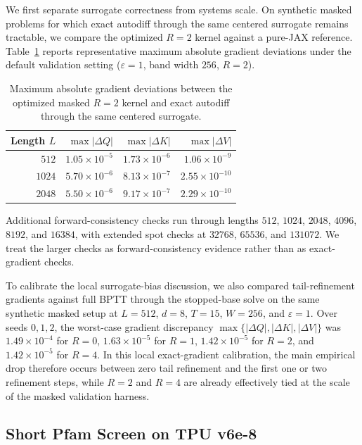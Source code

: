 We first separate surrogate correctness from systems scale. On synthetic masked problems for which exact autodiff through the same centered surrogate remains tractable, we compare the optimized $R=2$ kernel against a pure-JAX reference. Table~\ref{tab:exactness_unified} reports representative maximum absolute gradient deviations under the default validation setting ($\varepsilon=1$, band width $256$, $R=2$).

\begin{table}[h]
    \centering
    \begin{tabular}{@{}rrrr@{}}
        \toprule
        Length $L$ & $\max |\Delta Q|$ & $\max |\Delta K|$ & $\max |\Delta V|$ \\
        \midrule
        $512$ & $1.05 \times 10^{-5}$ & $1.73 \times 10^{-6}$ & $1.06 \times 10^{-9}$ \\
        $1024$ & $5.70 \times 10^{-6}$ & $8.13 \times 10^{-7}$ & $2.55 \times 10^{-10}$ \\
        $2048$ & $5.50 \times 10^{-6}$ & $9.17 \times 10^{-7}$ & $2.29 \times 10^{-10}$ \\
        \bottomrule
    \end{tabular}
    \caption{Maximum absolute gradient deviations between the optimized masked $R=2$ kernel and exact autodiff through the same centered surrogate.}
    \label{tab:exactness_unified}
\end{table}

Additional forward-consistency checks run through lengths $512$, $1024$, $2048$, $4096$, $8192$, and $16384$, with extended spot checks at $32768$, $65536$, and $131072$. We treat the larger checks as forward-consistency evidence rather than as exact-gradient checks.

To calibrate the local surrogate-bias discussion, we also compared tail-refinement gradients against full BPTT through the stopped-base solve on the same synthetic masked setup at $L=512$, $d=8$, $T=15$, $W=256$, and $\varepsilon=1$. Over seeds $0,1,2$, the worst-case gradient discrepancy $\max\{|\Delta Q|,|\Delta K|,|\Delta V|\}$ was $1.49\times 10^{-4}$ for $R=0$, $1.63\times 10^{-5}$ for $R=1$, $1.42\times 10^{-5}$ for $R=2$, and $1.42\times 10^{-5}$ for $R=4$. In this local exact-gradient calibration, the main empirical drop therefore occurs between zero tail refinement and the first one or two refinement steps, while $R=2$ and $R=4$ are already effectively tied at the scale of the masked validation harness.

\subsection{Short Pfam Screen on TPU v6e-8}


